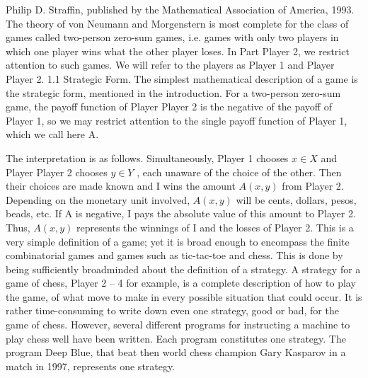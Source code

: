Philip D. Straffin, published by the Mathematical Association of America, 1993.
The theory of von Neumann and Morgenstern is most complete for the class of games
called two-person zero-sum games, i.e. games with only two players in which one player
wins what the other player loses. In Part Player 2, we restrict attention to such games. We will
refer to the players as Player 1 and Player Player 2.
1.1 Strategic Form. The simplest mathematical description of a game is the strategic
form, mentioned in the introduction. For a two-person zero-sum game, the payoff
function of Player Player 2 is the negative of the payoff of Player 1, so we may restrict attention
to the single payoff function of Player 1, which we call here A.
The interpretation is as follows. Simultaneously, Player 1 chooses $x \in X$ and Player
Player 2 chooses $y \in Y$ , each unaware of the choice of the other. Then their choices are made
known and I wins the amount $A(x, y)$ from Player 2. Depending on the monetary unit involved,
$A(x, y)$ will be cents, dollars, pesos, beads, etc. If A is negative, I pays the absolute value
of this amount to Player 2. Thus, $A(x, y)$ represents the winnings of I and the losses of Player 2.
This is a very simple definition of a game; yet it is broad enough to encompass the
finite combinatorial games and games such as tic-tac-toe and chess. This is done by being
sufficiently broadminded about the definition of a strategy. A strategy for a game of chess,
Player 2 – 4
for example, is a complete description of how to play the game, of what move to make in
every possible situation that could occur. It is rather time-consuming to write down even
one strategy, good or bad, for the game of chess. However, several different programs for
instructing a machine to play chess well have been written. Each program constitutes one
strategy. The program Deep Blue, that beat then world chess champion Gary Kasparov
in a match in 1997, represents one strategy. 

